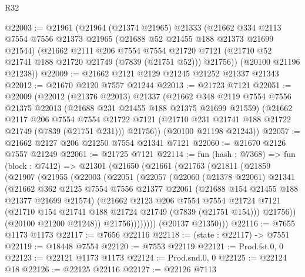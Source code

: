 \begin{lexlean}{R32}
\begin{coremodule}
@22003 := @21961
    (@21964
      (@21374 @21965)
      @21333
      (@21662
        @334
        @2113
        @7554
        @7556
        @21373
        @21965
        (@21688 @52 @21455 @188 @21373 @21699 @21544)
        (@21662
          @2111
          @206
          @7554
          @7554
          @21720
          @7121
          (@21710 @52 @21741 @188 @21720 @21749 (@7839 (@21751 @52)))
          @21756))
      (@20100 @21196 @21238))
@22009 := @21662 @2121 @2129 @21245 @21252 @21337 @21343
@22012 := @21670 @2120 @7557 @21244
@22013 := @21723 @7121
@22051 := @22009
    (@22012
      (@21376 @22013)
      @21337
      (@21662
        @348
        @2119
        @7554
        @7556
        @21375
        @22013
        (@21688 @231 @21455 @188 @21375 @21699 @21559)
        (@21662
          @2117
          @206
          @7554
          @7554
          @21722
          @7121
          (@21710 @231 @21741 @188 @21722 @21749 (@7839 (@21751 @231)))
          @21756))
      (@20100 @21198 @21243))
@22057 := @21662 @2127 @206 @21250 @7554 @21341 @7121
@22060 := @21670 @2126 @7557 @21249
@22061 := @21725 @7121
@22114 := fun (hash : @7368) =>
  fun (block : @7412) =>
  @21301
    (@21650
      (@21661
        (@21763
          (@21811
            (@21859
              (@21907
                (@21955
                  (@22003
                    (@22051
                      (@22057
                        (@22060
                          (@21378 @22061)
                          @21341
                          (@21662
                            @362
                            @2125
                            @7554
                            @7556
                            @21377
                            @22061
                            (@21688 @154 @21455 @188 @21377 @21699 @21574)
                            (@21662
                              @2123
                              @206
                              @7554
                              @7554
                              @21724
                              @7121
                              (@21710 @154 @21741 @188 @21724 @21749 (@7839 (@21751 @154)))
                              @21756))
                          (@20100 @21200 @21248))
                        @21756))))))))
        (@20137 @21350)))
@22116 := @7655 @1173 @1173
@22117 := @7656 @22116
@22118 := (state : @22117) -> @7551
@22119 := @18448 @7554
@22120 := @7553 @22119
@22121 := Prod.fst.{0, 0}
@22123 := @22121 @1173 @1173
@22124 := Prod.snd.{0, 0}
@22125 := @22124 @18
@22126 := @22125 @22116
@22127 := @22126 @7113

\end{coremodule}
\end{lexlean}
